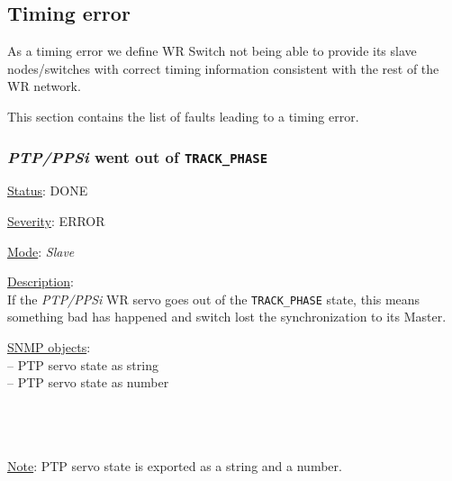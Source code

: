 \subsection{Timing error}
As a timing error we define WR Switch not being able to provide its slave
nodes/switches with correct timing information consistent with the rest of the
WR network.

\noindent This section contains the list of faults leading to a timing error.

\subsubsection{\bf \emph{PTP/PPSi} went out of \texttt{TRACK\_PHASE}}
		\label{fail:timing:ppsi_track_phase}
    \begin{pck_descr}
			\item [] \underline{Status}: DONE
			\item [] \underline{Severity}: ERROR
			\item [] \underline{Mode}: \emph{Slave}
			\item [] \underline{Description}:\\
				If the \emph{PTP/PPSi} WR servo goes out of the \texttt{TRACK\_PHASE}
				state, this means something bad has happened and switch lost the
				synchronization to its Master.
			\item [] \underline{SNMP objects}:\\
				 -- PTP servo state as string\\
				 -- PTP servo state as number\\
				\\
				 \\
				 \\

			\item [] \underline{Note}: PTP servo state is exported as a string and a number.
		\end{pck_descr}

